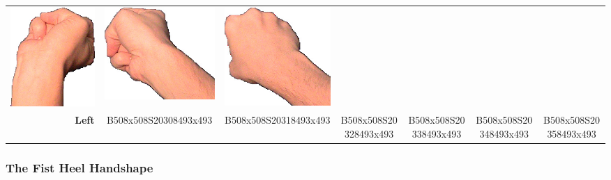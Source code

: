 \documentclass{article}
\begin{document}
\begin{center}
\begin{tabular}{r*{6}{c}}
\includegraphics[scale=0.1]{images/10-06-4.jpg}&
\includegraphics[scale=0.1]{images/10-06-5.jpg}&
\includegraphics[scale=0.1]{images/10-06-6.jpg}\\
\textbf{Left}&
B508x508S20308493x493&
B508x508S20318493x493&
B508x508S20328493x493&
B508x508S20338493x493&
B508x508S20348493x493&
B508x508S20358493x493\\
\end{tabular}
\end{center}

\subsubsection{The Fist Heel Handshape}
\end{document}
